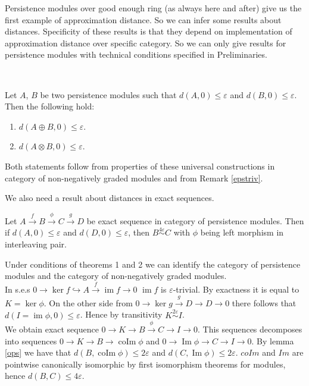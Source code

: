 Persistence modules over good enough ring (as always here and after) give us the first example of approximation distance. So we can infer some results about distances. Specificity of these results is that they depend on implementation of approximation distance over specific category. So we can only give results for persistence modules with technical conditions specified in Preliminaries.\\

\begin{proposition} ~ \par
  Let $A$, $B$ be two persistence modules such that $d(A,0) \leq \varepsilon$ and $d(B,0) \leq \varepsilon$. Then the following hold:
  \begin{enumerate}
    \item $d(A \oplus B,0) \leq \varepsilon$.
    \item $d(A \otimes B,0) \leq \varepsilon$.
  \end{enumerate}
\end{proposition}

\begin{pf}
  Both statements follow from properties of these universal constructions in category of non-negatively graded modules and from Remark \ref{epstriv}.
\end{pf}

We also need a result about distances in exact sequences.\\

\begin{proposition}
  \label{major}
  Let $A \xrightarrow{f} B \xrightarrow{\phi} C \xrightarrow{g} D$ be exact sequence in category of persistence modules. Then if $d(A,0) \leq \varepsilon$ and $d(D,0) \leq \varepsilon$, then $B \stackrel{4\varepsilon}{\sim} C$ with $\phi$ being left morphism in interleaving pair.
\end{proposition}

\begin{pf}
  Under conditions of theorems 1 and 2 we can identify the category of persistence modules and the category of non-negatively graded modules.\\

  In s.e.s $0 \to \ker{f} \hookrightarrow A \xrightarrow{f} \operatorname{im}f \to 0$ $\operatorname{im}f$ is $\varepsilon$-trivial. By exactness it is equal to $K = \ker \phi$. On the other side from $0 \to \ker{g} \xrightarrow{g} D \to D \to 0$ there follows that $d(I = \operatorname{im} \phi, 0) \leq \varepsilon$. Hence by transitivity $K \stackrel{2\varepsilon}{\sim} I$.\\

  We obtain exact sequence $0 \to K \to B \xrightarrow{\phi} C \to I \to 0$. This sequences decomposes into sequences $0 \to K \to B \to \operatorname{coIm}\phi$ and $0 \to \operatorname{Im}\phi \to C \to I \to 0$. By lemma \ref{ops} we have that $d(B,\operatorname{coIm}\phi) \leq 2\varepsilon$ and $d(C,\operatorname{Im}\phi) \leq 2\varepsilon$. $coIm$ and $Im$ are pointwise canonically isomorphic by first isomorphism theorems for modules, hence $d(B,C) \leq 4\varepsilon$.
\end{pf}\\
